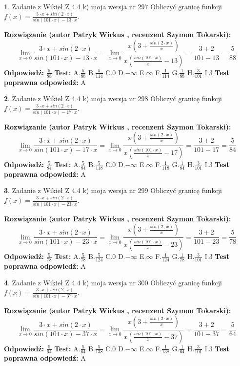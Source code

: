 \documentclass[12pt, a4paper]{article}
\theoremstyle{definition} %
\newtheorem{zad}{}
\newcommand{\zadStart}[1]{\begin{zad}#1\newline}
\newcommand{\zadStop}{\end{zad}}
\newcommand{\rozwStart}[2]{\noindent \textbf{Rozwiązanie (autor #1 , recenzent #2): }\newline}
\newcommand{\rozwStop}{\newline}
\newcommand{\odpStart}{\noindent \textbf{Odpowiedź:}\newline}
\newcommand{\odpStop}{\newline}
\newcommand{\testStart}{\noindent \textbf{Test:}\newline}
\newcommand{\testStop}{\newline}
\newcommand{\kluczStart}{\noindent \textbf{Test poprawna odpowiedź:}\newline}
\newcommand{\kluczStop}{\newline}
\begin{document}
\zadStart{Zadanie z Wikieł Z 4.4 k) moja wersja nr 297}
Obliczyć granicę funkcji $f(x)=\frac{3\cdot x +sin(2\cdot x)}{sin(101\cdot x) -13\cdot x}$.
\zadStop
\rozwStart{Patryk Wirkus}{Szymon Tokarski}
$$\lim\limits_{x\to 0}\frac{3\cdot x +sin(2\cdot x)}{sin(101\cdot x) -13\cdot x}
=\lim\limits_{x\to 0}\frac{x(3+\frac{sin(2\cdot x)}{x})}{x(\frac{sin(101\cdot x)}{x}-13)}
=\frac{3+2}{101-13} = \frac{5}{88}$$
\rozwStop
\odpStart
$\frac{5}{88}$
\odpStop
\testStart
A.$\frac{5}{88}$
B.$\frac{5}{114}$
C.$0$
D.$-\infty$
E.$\infty$
F.$\frac{1}{114}$
G.$\frac{1}{88}$
H.$\frac{3}{101}$
I.$3$
\testStop
\kluczStart
A
\kluczStop



\zadStart{Zadanie z Wikieł Z 4.4 k) moja wersja nr 298}
Obliczyć granicę funkcji $f(x)=\frac{3\cdot x +sin(2\cdot x)}{sin(101\cdot x) -17\cdot x}$.
\zadStop
\rozwStart{Patryk Wirkus}{Szymon Tokarski}
$$\lim\limits_{x\to 0}\frac{3\cdot x +sin(2\cdot x)}{sin(101\cdot x) -17\cdot x}
=\lim\limits_{x\to 0}\frac{x(3+\frac{sin(2\cdot x)}{x})}{x(\frac{sin(101\cdot x)}{x}-17)}
=\frac{3+2}{101-17} = \frac{5}{84}$$
\rozwStop
\odpStart
$\frac{5}{84}$
\odpStop
\testStart
A.$\frac{5}{84}$
B.$\frac{5}{118}$
C.$0$
D.$-\infty$
E.$\infty$
F.$\frac{1}{118}$
G.$\frac{1}{84}$
H.$\frac{3}{101}$
I.$3$
\testStop
\kluczStart
A
\kluczStop



\zadStart{Zadanie z Wikieł Z 4.4 k) moja wersja nr 299}
Obliczyć granicę funkcji $f(x)=\frac{3\cdot x +sin(2\cdot x)}{sin(101\cdot x) -23\cdot x}$.
\zadStop
\rozwStart{Patryk Wirkus}{Szymon Tokarski}
$$\lim\limits_{x\to 0}\frac{3\cdot x +sin(2\cdot x)}{sin(101\cdot x) -23\cdot x}
=\lim\limits_{x\to 0}\frac{x(3+\frac{sin(2\cdot x)}{x})}{x(\frac{sin(101\cdot x)}{x}-23)}
=\frac{3+2}{101-23} = \frac{5}{78}$$
\rozwStop
\odpStart
$\frac{5}{78}$
\odpStop
\testStart
A.$\frac{5}{78}$
B.$\frac{5}{124}$
C.$0$
D.$-\infty$
E.$\infty$
F.$\frac{1}{124}$
G.$\frac{1}{78}$
H.$\frac{3}{101}$
I.$3$
\testStop
\kluczStart
A
\kluczStop



\zadStart{Zadanie z Wikieł Z 4.4 k) moja wersja nr 300}
Obliczyć granicę funkcji $f(x)=\frac{3\cdot x +sin(2\cdot x)}{sin(101\cdot x) -37\cdot x}$.
\zadStop
\rozwStart{Patryk Wirkus}{Szymon Tokarski}
$$\lim\limits_{x\to 0}\frac{3\cdot x +sin(2\cdot x)}{sin(101\cdot x) -37\cdot x}
=\lim\limits_{x\to 0}\frac{x(3+\frac{sin(2\cdot x)}{x})}{x(\frac{sin(101\cdot x)}{x}-37)}
=\frac{3+2}{101-37} = \frac{5}{64}$$
\rozwStop
\odpStart
$\frac{5}{64}$
\odpStop
\testStart
A.$\frac{5}{64}$
B.$\frac{5}{138}$
C.$0$
D.$-\infty$
E.$\infty$
F.$\frac{1}{138}$
G.$\frac{1}{64}$
H.$\frac{3}{101}$
I.$3$
\testStop
\kluczStart
A
\kluczStop
\end{document}
